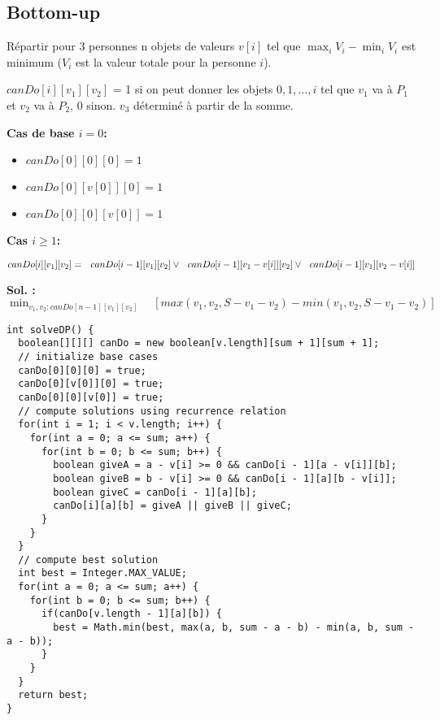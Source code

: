 \subsection{Bottom-up}
Répartir pour 3 personnes n objets de valeurs $v[i]$ tel que $\max_i V_i - \min_i V_i$ est minimum ($V_i$ est la valeur totale pour la personne $i$).

$canDo[i][v_1][v_2]$ =  1 si on peut donner les objets $0, 1, \ldots, i$ tel que $v_1$ va à $P_1$ et $v_2$ va à $P_2$, 0 sinon. $v_3$ déterminé à partir de la somme.

\begin{minipage}{0.25\textwidth}
\textbf{Cas de base $i = 0$:}
\begin{itemize}
\item $ canDo[0][0][0]  = 1$
\item $ canDo[0][v[0]][0]  = 1$ 
\item $ canDo[0][0][v[0]]  = 1$
\end{itemize}
\end{minipage}
\begin{minipage}{0.25\textwidth}
\textbf{Cas $i \geq 1$:} 

$ canDo[i][v_1][v_2] =  \\\text{\ \ }canDo[i - 1][v_1][v_2] \vee \\  \text{\ \ }canDo[i - 1][v_1 - v[i]][v_2] \vee \\  \text{\ \ } canDo[i - 1][v_1][v_2 - v[i]] $
\end{minipage}
\newline
\textbf{Sol. :} $ \min_{v_1, v_2 : canDo[n - 1][v_1][v_2]} \quad [max(v_1, v_2, S - v_1 - v_2) - min(v_1, v_2, S - v_1 - v_2)]$
\newline
\begin{lstlisting}
int solveDP() {
  boolean[][][] canDo = new boolean[v.length][sum + 1][sum + 1];
  // initialize base cases
  canDo[0][0][0] = true;
  canDo[0][v[0]][0] = true;
  canDo[0][0][v[0]] = true;
  // compute solutions using recurrence relation
  for(int i = 1; i < v.length; i++) {
    for(int a = 0; a <= sum; a++) {
      for(int b = 0; b <= sum; b++) {
        boolean giveA = a - v[i] >= 0 && canDo[i - 1][a - v[i]][b];
        boolean giveB = b - v[i] >= 0 && canDo[i - 1][a][b - v[i]];
        boolean giveC = canDo[i - 1][a][b];
        canDo[i][a][b] = giveA || giveB || giveC;
      }
    }
  }
  // compute best solution
  int best = Integer.MAX_VALUE;
  for(int a = 0; a <= sum; a++) {
    for(int b = 0; b <= sum; b++) {
      if(canDo[v.length - 1][a][b]) {
        best = Math.min(best, max(a, b, sum - a - b) - min(a, b, sum - a - b));
      }
    }
  }
  return best;
}
\end{lstlisting}